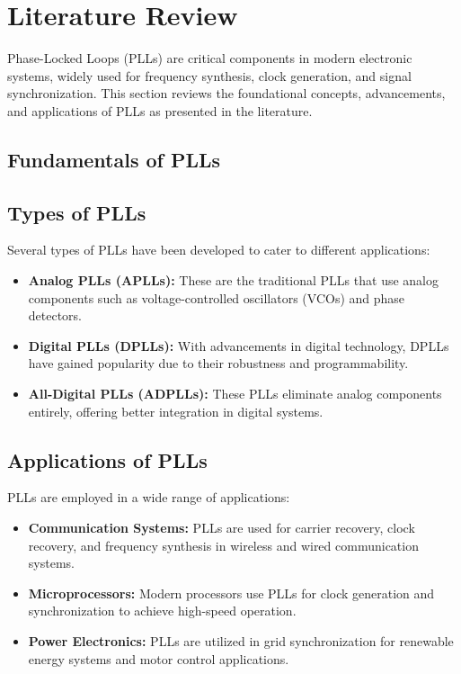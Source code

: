 \chapter{Literature Review}

Phase-Locked Loops (PLLs) are critical components in modern electronic systems, widely used for frequency synthesis, clock generation, and signal synchronization. This section reviews the foundational concepts, advancements, and applications of PLLs as presented in the literature.

\section{Fundamentals of PLLs}

\section{Types of PLLs}
Several types of PLLs have been developed to cater to different applications:
\begin{itemize}
    \item \textbf{Analog PLLs (APLLs):} These are the traditional PLLs that use analog components such as voltage-controlled oscillators (VCOs) and phase detectors.
    \item \textbf{Digital PLLs (DPLLs):} With advancements in digital technology, DPLLs have gained popularity due to their robustness and programmability.
    \item \textbf{All-Digital PLLs (ADPLLs):} These PLLs eliminate analog components entirely, offering better integration in digital systems.
\end{itemize}

\section{Applications of PLLs}
PLLs are employed in a wide range of applications:
\begin{itemize}
    \item \textbf{Communication Systems:} PLLs are used for carrier recovery, clock recovery, and frequency synthesis in wireless and wired communication systems.
    \item \textbf{Microprocessors:} Modern processors use PLLs for clock generation and synchronization to achieve high-speed operation.
    \item \textbf{Power Electronics:} PLLs are utilized in grid synchronization for renewable energy systems and motor control applications.
\end{itemize}

